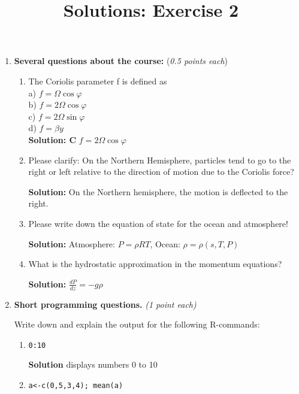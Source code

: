 \documentclass[a4paper,12pt]{article}
\title{Solutions: Exercise 2}
\begin{document}
\maketitle
\thispagestyle{fancy}
\begin{enumerate}
    

\item {\bf Several questions about the course:} (\textit{0.5 points each})\\
\begin{enumerate}
\item The
      Coriolis parameter f is defined as \\
a) $ f =
      \Omega \cos \varphi $\\
b) $ f = 2
      \Omega \cos \varphi $ \\
c) $ f = 2
      \Omega \sin \varphi $ \\
d) $ f =
      \beta y $ \\
\textbf{Solution: C} $f=2\Omega\cos\varphi$

\item Please clarify: On the Northern Hemisphere, particles tend to go to the right or left relative to the direction of motion due to the Coriolis force? 

\textbf{Solution:} On the Northern hemisphere, the motion is deflected
to the right.

\item Please write down the equation of state for the ocean and atmosphere!

\textbf{Solution:} Atmosphere: $P=\rho RT$, Ocean: $\rho=\rho(s,T,P)$

\item What is the hydrostatic approximation in the momentum equations?

\textbf{Solution:} $\frac{dP}{dz} = -g \rho$


\end{enumerate}
\item 
{\bf Short programming questions.}\textit{ (\textit{1 point each})}

 Write down and explain the output for the following R-commands:
 \begin{enumerate}

\item
      \begin{verbatim}0:10 \end{verbatim}

\textbf{Solution} displays numbers 0 to 10

\item
      \begin{verbatim}a<-c(0,5,3,4); mean(a)\end{verbatim} 


\end{enumerate}
\end{enumerate}
\end{document}
